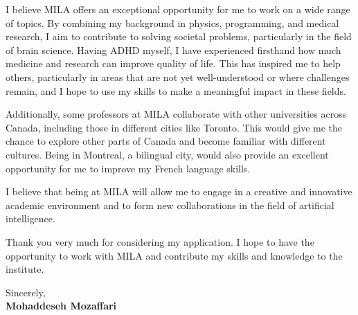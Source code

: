 \documentclass[letterpaper,11pt]{letter}
\begin{document}
I believe MILA offers an exceptional opportunity for me to work on a wide range of topics. By combining my background in physics, programming, and medical research, I aim to contribute to solving societal problems, particularly in the field of brain science. Having ADHD myself, I have experienced firsthand how much medicine and research can improve quality of life. This has inspired me to help others, particularly in areas that are not yet well-understood or where challenges remain, and I hope to use my skills to make a meaningful impact in these fields.

Additionally, some professors at MILA collaborate with other universities across Canada, including those in different cities like Toronto. This would give me the chance to explore other parts of Canada and become familiar with different cultures. Being in Montreal, a bilingual city, would also provide an excellent opportunity for me to improve my French language skills.

I believe that being at MILA will allow me to engage in a creative and innovative academic environment and to form new collaborations in the field of artificial intelligence.

Thank you very much for considering my application. I hope to have the opportunity to work with MILA and contribute my skills and knowledge to the institute.



\begin{flushleft}
    Sincerely, \\
    \textbf{Mohaddeseh Mozaffari}
\end{flushleft}
\end{document}
